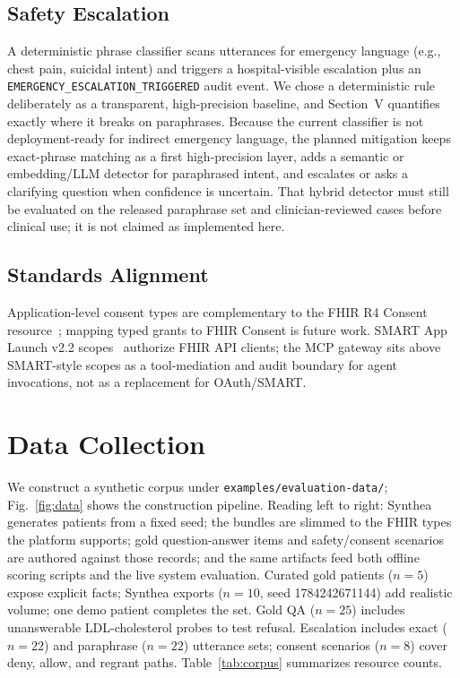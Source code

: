 \documentclass[conference]{IEEEtran}
\begin{document}
\subsection{Safety Escalation}
A deterministic phrase classifier scans utterances for emergency language (e.g., chest pain, suicidal intent) and triggers a hospital-visible escalation plus an \texttt{EMERGENCY\_ESCALATION\_TRIGGERED} audit event.
We chose a deterministic rule deliberately as a transparent, high-precision baseline, and Section~V quantifies exactly where it breaks on paraphrases.
Because the current classifier is not deployment-ready for indirect emergency language, the planned mitigation keeps exact-phrase matching as a first high-precision layer, adds a semantic or embedding/LLM detector for paraphrased intent, and escalates or asks a clarifying question when confidence is uncertain.
That hybrid detector must still be evaluated on the released paraphrase set and clinician-reviewed cases before clinical use; it is not claimed as implemented here.

\subsection{Standards Alignment}
Application-level consent types are complementary to the FHIR R4 Consent resource~\cite{hl7fhirconsent}; mapping typed grants to FHIR Consent is future work.
SMART App Launch v2.2 scopes~\cite{smartapplaunch22} authorize FHIR API clients; the MCP gateway sits above SMART-style scopes as a tool-mediation and audit boundary for agent invocations, not as a replacement for OAuth/SMART.

\section{Data Collection}
We construct a synthetic corpus under \texttt{examples/evaluation-data/}; Fig.~\ref{fig:data} shows the construction pipeline.
Reading left to right: Synthea~\cite{walonoski2018synthea} generates patients from a fixed seed; the bundles are slimmed to the FHIR types the platform supports; gold question-answer items and safety/consent scenarios are authored against those records; and the same artifacts feed both offline scoring scripts and the live system evaluation.
Curated gold patients ($n{=}5$) expose explicit facts; Synthea exports ($n{=}10$, seed 1784242671144) add realistic volume; one demo patient completes the set.
Gold QA ($n{=}25$) includes unanswerable LDL-cholesterol probes to test refusal.
Escalation includes exact ($n{=}22$) and paraphrase ($n{=}22$) utterance sets; consent scenarios ($n{=}8$) cover deny, allow, and regrant paths.
Table~\ref{tab:corpus} summarizes resource counts.
\end{document}
